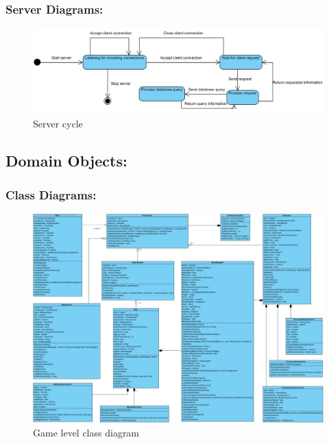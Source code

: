 \documentclass[letterpaper]{article}
\begin{document}
				\subsubsection*{Server Diagrams:}
				\vspace{0.1in}
			
					\begin{figure}[H]
					\centering
					\includegraphics[width=180mm]{UML_Diagram/State/Server_State_Diagram.jpg}
					\caption{Server cycle}
					\label{overflow}
					\end{figure}
			
			\vspace{0.2in}
			\subsection*{Domain Objects:}
			\vspace{0.1in}
			
				\vspace{0.2in}
				\subsubsection*{Class Diagrams:}
				\vspace{0.1in}
				
					\begin{figure}[H]
					\centering
					\includegraphics[width=180mm]{UML_Diagram/Class/Game_Classes.jpg}
					\caption{Game level class diagram}
					\label{overflow}
					\end{figure}
					
\end{document}
